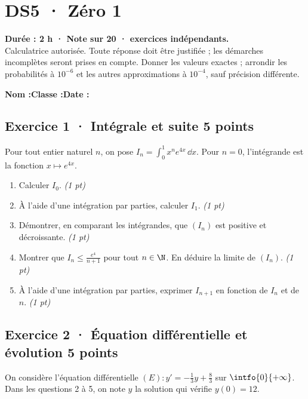 \mxnewpage{}\label{sujet:7-1}

\section*{DS5 · Zéro 1}


\textbf{Durée : 2 h · Note sur 20 ·  exercices indépendants.}\\Calculatrice autorisée. Toute réponse doit être justifiée ; les démarches incomplètes seront prises en compte. Donner les valeurs exactes ; arrondir les probabilités à $10^{-6}$ et les autres approximations à $10^{-4}$, sauf précision différente.

\smallskip\textbf{Nom :}\enspace\dotfill\quad\textbf{Classe :}\enspace\dotfill\quad\textbf{Date :}\enspace\dotfill

\subsection*{Exercice 1 · Intégrale et suite \hfill 5 points}Pour tout entier naturel $n$, on pose $I_n=\displaystyle\int_0^1x^ne^{4x}\,\dd x$. Pour $n=0$, l'intégrande est la fonction $x\mapsto e^{4x}$.

\begin{enumerate}

\item Calculer $I_0$. \hfill\textit{(1 pt)}

\item À l'aide d'une intégration par parties, calculer $I_1$. \hfill\textit{(1 pt)}

\item Démontrer, en comparant les intégrandes, que $(I_n)$ est positive et décroissante. \hfill\textit{(1 pt)}

\item Montrer que $I_n\le\frac{e^{4}}{n+1}$ pour tout $n\in\N$. En déduire la limite de $(I_n)$. \hfill\textit{(1 pt)}

\item À l'aide d'une intégration par parties, exprimer $I_{n+1}$ en fonction de $I_n$ et de $n$. \hfill\textit{(1 pt)}

\end{enumerate}

\subsection*{Exercice 2 · Équation différentielle et évolution \hfill 5 points}On considère l'équation différentielle $(E):y'=-\frac1{3}y+\frac{8}{3}$ sur $\intfo{0}{+\infty}$. Dans les questions 2 à 5, on note $y$ la solution qui vérifie $y(0)=12$.

